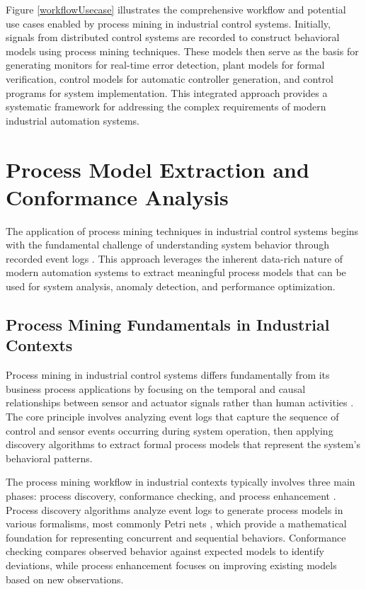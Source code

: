Figure \ref{workflowUsecase} illustrates the comprehensive workflow and potential use cases enabled by process mining in industrial control systems. Initially, signals from distributed control systems are recorded to construct behavioral models using process mining techniques. These models then serve as the basis for generating monitors for real-time error detection, plant models for formal verification, control models for automatic controller generation, and control programs for system implementation. This integrated approach provides a systematic framework for addressing the complex requirements of modern industrial automation systems.

\section{Process Model Extraction and Conformance Analysis}

The application of process mining techniques in industrial control systems begins with the fundamental challenge of understanding system behavior through recorded event logs \cite{van2004workflow}. This approach leverages the inherent data-rich nature of modern automation systems to extract meaningful process models that can be used for system analysis, anomaly detection, and performance optimization.

\subsection{Process Mining Fundamentals in Industrial Contexts}

Process mining in industrial control systems differs fundamentally from its business process applications by focusing on the temporal and causal relationships between sensor and actuator signals rather than human activities \cite{paper1}. The core principle involves analyzing event logs that capture the sequence of control and sensor events occurring during system operation, then applying discovery algorithms to extract formal process models that represent the system's behavioral patterns.

The process mining workflow in industrial contexts typically involves three main phases: process discovery, conformance checking, and process enhancement \cite{van2012process2}. Process discovery algorithms analyze event logs to generate process models in various formalisms, most commonly Petri nets \cite{petri1962}, which provide a mathematical foundation for representing concurrent and sequential behaviors. Conformance checking compares observed behavior against expected models to identify deviations, while process enhancement focuses on improving existing models based on new observations.



